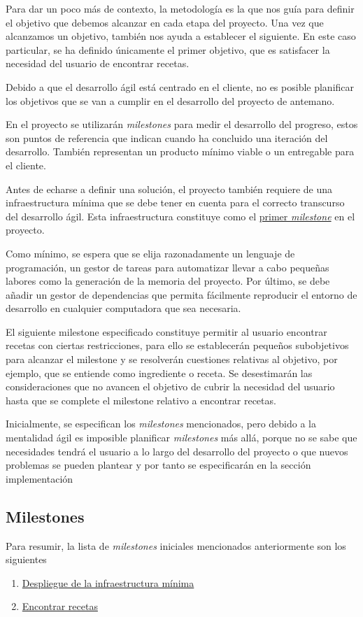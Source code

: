 Para dar un poco más de contexto, la metodología es la que nos guía para definir el objetivo que debemos alcanzar en cada etapa del proyecto. Una vez que alcanzamos un objetivo, también nos ayuda a establecer el siguiente. En este caso particular, se ha definido únicamente el primer objetivo, que es satisfacer la necesidad del usuario de encontrar recetas. 

Debido a que el desarrollo ágil está centrado en el cliente, no es posible planificar los objetivos que se van a cumplir en el desarrollo del proyecto de antemano.  

En el proyecto se utilizarán \emph{milestones} para medir el desarrollo del progreso, estos son puntos de referencia que indican cuando ha concluido una iteración del desarrollo. También representan un producto mínimo viable o un entregable para el cliente.\cite{milestone2022}

Antes de echarse a definir una solución, el proyecto también requiere de una infraestructura mínima que se debe tener en cuenta para el correcto transcurso del desarrollo ágil. Esta infraestructura constituye como el \href{https://github.com/Slowmybrosh/TFG-DietPlanner/milestone/10}{primer \emph{milestone}} en el proyecto.

Como mínimo, se espera que se elija razonadamente un lenguaje de programación, un gestor de tareas para automatizar llevar a cabo pequeñas labores como la generación de la memoria del proyecto. Por último, se debe añadir un gestor de dependencias que permita fácilmente reproducir el entorno de desarrollo en cualquier computadora que sea necesaria.

El siguiente milestone especificado constituye permitir al usuario encontrar recetas con ciertas restricciones, para ello se establecerán pequeños subobjetivos para alcanzar el milestone y se resolverán cuestiones relativas al objetivo, por ejemplo, que se entiende como ingrediente o receta. Se desestimarán las consideraciones que no avancen el objetivo de cubrir la necesidad del usuario hasta que se complete el milestone relativo a encontrar recetas.

Inicialmente, se especifican los \emph{milestones} mencionados, pero debido a la mentalidad ágil es imposible planificar \emph{milestones} más allá, porque no se sabe que necesidades tendrá el usuario a lo largo del desarrollo del proyecto o que nuevos problemas se pueden plantear y por tanto se especificarán en la sección implementación

\subsection{Milestones}
Para resumir, la lista de \emph{milestones} iniciales mencionados anteriormente son los siguientes\:
\begin{enumerate}
    \item \href{https://github.com/Slowmybrosh/TFG-DietPlanner/milestone/10}{Despliegue de la infraestructura mínima}
    \item \href{https://github.com/Slowmybrosh/TFG-DietPlanner/milestone/3}{Encontrar recetas}
\end{enumerate}